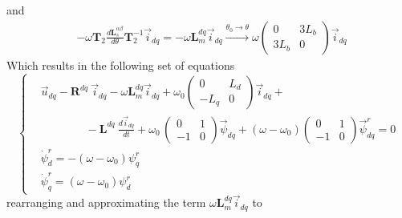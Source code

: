 \documentclass[11pt,a4paper,oneside]{book}
\numberwithin{equation}{section}
\theoremstyle{it}
\theoremstyle{definition}
\begin{document}
and
\begin{equation}
	\begin{aligned}
		&-\omega\mathbf{T}_2\frac{d\mathbf{L}_s^{\alpha\beta}}{d\theta}\mathbf{T}_2^{-1}\vec{i}_{dq}
		= -\omega\mathbf{L}_m^{dq}\vec{i}_{dq}
		\xrightarrow{\theta_0\rightarrow\theta} \omega\begin{pmatrix} 0 & 
			3L_b\\ 3L_b & 0 \end{pmatrix}\vec{i}_{dq}\		
	\end{aligned}
\end{equation}
Which results in the following set of equations
\begin{equation*}
	\left\lbrace \begin{aligned}
		& \vec{u}_{dq}-\mathbf{R}^{dq}\ \vec{i}_{dq} 
		-\omega\mathbf{L}_m^{dq}\vec{i}_{dq} + \omega_0\begin{pmatrix} 0 & 
			L_d\\ -L_q & 0 \end{pmatrix}\vec{i}_{dq} + \\[6pt] 
		&\qquad\qquad-\mathbf{L}^{dq}\ \frac{d\vec{i}_{dq}}{dt} + 
		\omega_0\,\begin{pmatrix} 0 & 1\\ -1 & 0 
		\end{pmatrix}\vec{\psi}_{dq} + (\omega - \omega_0)\begin{pmatrix} 0 
			& 1\\ -1 & 0 \end{pmatrix}\vec{\psi}_{dq}^r = 0\\[6pt]
		& \dot{\psi}_d^r = -\left( \omega-\omega_0\right)\psi_q^r \\[6pt]
		&\dot{\psi}_q^r = \left( \omega-\omega_0\right)\psi_d^r
	\end{aligned} \right. 
\end{equation*}
rearranging and approximating the term 
$\omega\mathbf{L}_m^{dq}\vec{i}_{dq}$ to 
\end{document}
